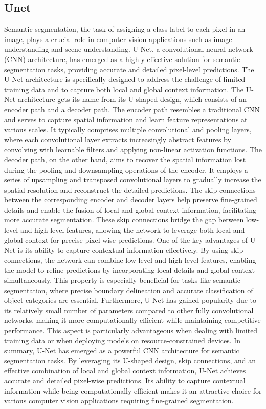 \documentclass[acmtog, authorversion]{acmart}
\begin{document}
\subsection{Unet}
Semantic segmentation, the task of assigning a class label to each pixel in an image, plays a crucial role in computer vision applications such as image understanding and scene understanding. U-Net, a convolutional neural network (CNN) architecture, has emerged as a highly effective solution for semantic segmentation tasks, providing accurate and detailed pixel-level predictions. The U-Net architecture is specifically designed to address the challenge of limited training data and to capture both local and global context information.
The U-Net architecture gets its name from its U-shaped design, which consists of an encoder path and a decoder path. The encoder path resembles a traditional CNN and serves to capture spatial information and learn feature representations at various scales. It typically comprises multiple convolutional and pooling layers, where each convolutional layer extracts increasingly abstract features by convolving with learnable filters and applying non-linear activation functions.
The decoder path, on the other hand, aims to recover the spatial information lost during the pooling and downsampling operations of the encoder. It employs a series of upsampling and transposed convolutional layers to gradually increase the spatial resolution and reconstruct the detailed predictions. The skip connections between the corresponding encoder and decoder layers help preserve fine-grained details and enable the fusion of local and global context information, facilitating more accurate segmentation. These skip connections bridge the gap between low-level and high-level features, allowing the network to leverage both local and global context for precise pixel-wise predictions.
One of the key advantages of U-Net is its ability to capture contextual information effectively. By using skip connections, the network can combine low-level and high-level features, enabling the model to refine predictions by incorporating local details and global context simultaneously. This property is especially beneficial for tasks like semantic segmentation, where precise boundary delineation and accurate classification of object categories are essential.
Furthermore, U-Net has gained popularity due to its relatively small number of parameters compared to other fully convolutional networks, making it more computationally efficient while maintaining competitive performance. This aspect is particularly advantageous when dealing with limited training data or when deploying models on resource-constrained devices.
In summary, U-Net has emerged as a powerful CNN architecture for semantic segmentation tasks. By leveraging its U-shaped design, skip connections, and an effective combination of local and global context information, U-Net achieves accurate and detailed pixel-wise predictions. Its ability to capture contextual information while being computationally efficient makes it an attractive choice for various computer vision applications requiring fine-grained segmentation.
\end{document}
